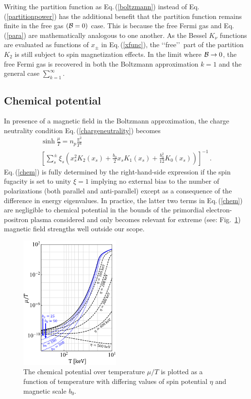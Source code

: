 \documentclass[reprint]{revtex4-2}
\newcommand{\req}[1]{Eq.\,(\ref{#1})}
\newcommand{\rf}[1]{Fig.~{\ref{#1}}}
\begin{document}
Writing the partition function as \req{boltzmann} instead of \req{partitionpower} has the additional benefit that the partition function remains finite in the free gas $({\cal B}=0)$ case. This is because the free Fermi gas and \req{para} are mathematically analogous to one another. As the Bessel $K_{\nu}$ functions are evaluated as functions of $x_{\pm}$ in \req{xfunc}, the \lq\lq free\rq\rq\ part of the partition $K_{2}$ is still subject to spin magnetization effects. In the limit where ${\cal B}\rightarrow0$, the free Fermi gas is recovered in both the Boltzmann approximation $k=1$ and the general case $\sum_{k=1}^{\infty}$.

\subsection{Chemical potential}
\label{sec:chem}
\noindent In presence of a magnetic field in the Boltzmann approximation, the charge neutrality condition \req{chargeneutrality} becomes
\begin{multline}
    \label{chem}
    \sinh{\frac{\mu}{T}}=n_{p}\frac{\pi^{2}}{T^{3}}\\
    \left[\sum_{s}^{\pm}\xi_{s}\left(x_{s}^{2}K_{2}(x_{s})+\frac{b_{0}}{2}x_{s}K_{1}(x_{s})+\frac{b_{0}^{2}}{12}K_{0}(x_{s})\right)\right]^{-1}\,.
\end{multline}
\req{chem} is fully determined by the right-hand-side expression if the spin fugacity is set to unity $\xi=1$ implying no external bias to the number of polarizations (both parallel and anti-parallel) except as a consequence of the difference in energy eigenvalues. In practice, the latter two terms in \req{chem} are negligible to chemical potential in the bounds of the primordial electron-positron plasma considered and only becomes relevant for extreme (see: \rf{fig:chemicalpotential}) magnetic field strengths well outside our scope.

\begin{figure}[ht]
    \centering
    \includegraphics[width=0.45\textwidth]{plots/ChemicalPotential_06.png}
    \caption{The chemical potential over temperature $\mu/T$ is plotted as a function of temperature with differing values of spin potential $\eta$ and magnetic scale $b_{0}$.}
    \label{fig:chemicalpotential}
\end{figure}
\end{document}
